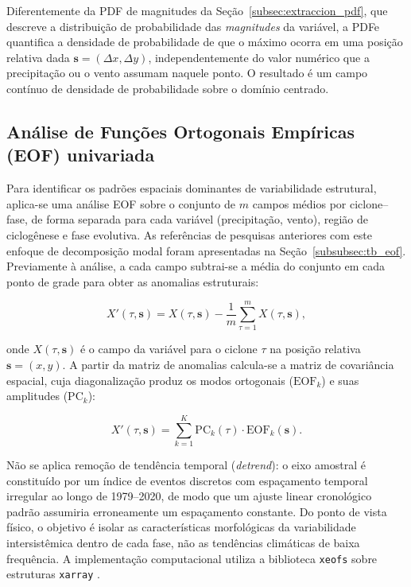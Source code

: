Diferentemente da PDF de magnitudes da Seção~\ref{subsec:extraccion_pdf}, que descreve a distribuição de probabilidade das \emph{magnitudes} da variável, a PDFe quantifica a densidade de probabilidade de que o máximo ocorra em uma posição relativa dada $\mathbf{s} = (\Delta x, \Delta y)$, independentemente do valor numérico que a precipitação ou o vento assumam naquele ponto. O resultado é um campo contínuo de densidade de probabilidade sobre o domínio centrado.

\subsection{Análise de Funções Ortogonais Empíricas (EOF) univariada}\label{subsec:eof_univariado}

Para identificar os padrões espaciais dominantes de variabilidade estrutural, aplica-se uma análise EOF sobre o conjunto de $m$ campos médios por ciclone--fase, de forma separada para cada variável (precipitação, vento), região de ciclogênese e fase evolutiva. As referências de pesquisas anteriores com este enfoque de decomposição modal foram apresentadas na Seção~\ref{subsubsec:tb_eof}. Previamente à análise, a cada campo subtrai-se a média do conjunto em cada ponto de grade para obter as anomalias estruturais:

\begin{equation}
    X'(\tau, \mathbf{s}) = X(\tau, \mathbf{s}) - \frac{1}{m}\sum_{\tau=1}^{m}X(\tau, \mathbf{s}),
\end{equation}

onde $X(\tau, \mathbf{s})$ é o campo da variável para o ciclone $\tau$ na posição relativa $\mathbf{s} = (x,y)$. A partir da matriz de anomalias calcula-se a matriz de covariância espacial, cuja diagonalização produz os modos ortogonais ($\text{EOF}_k$) e suas amplitudes ($\text{PC}_k$):

\begin{equation}
    X'(\tau, \mathbf{s}) = \sum_{k=1}^{K} \text{PC}_k(\tau) \cdot \text{EOF}_k(\mathbf{s}).
\end{equation}

Não se aplica remoção de tendência temporal (\textit{detrend}): o eixo amostral é constituído por um índice de eventos discretos com espaçamento temporal irregular ao longo de 1979--2020, de modo que um ajuste linear cronológico padrão assumiria erroneamente um espaçamento constante. Do ponto de vista físico, o objetivo é isolar as características morfológicas da variabilidade intersistêmica dentro de cada fase, não as tendências climáticas de baixa frequência. A implementação computacional utiliza a biblioteca \texttt{xeofs} \citep{rieger2024xeofs} sobre estruturas \texttt{xarray} \citep{hoyer2017xarray}.

